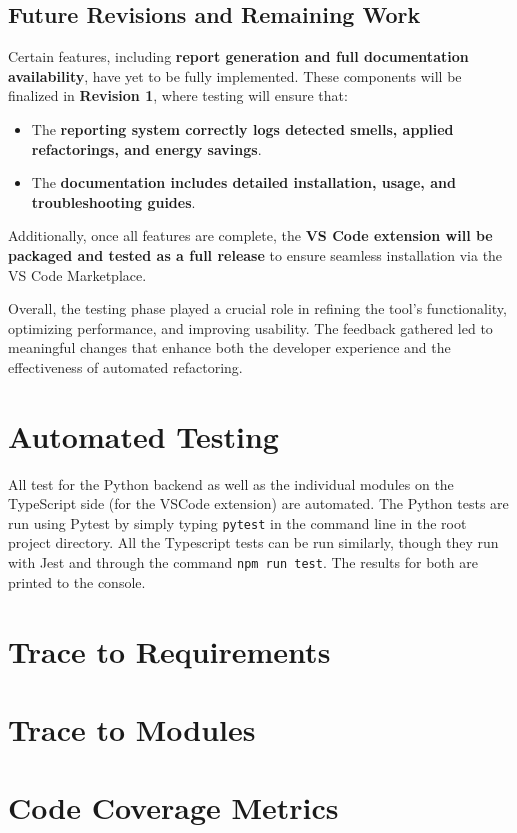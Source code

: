 \documentclass[12pt, titlepage]{article}
\begin{document}
\subsection{Future Revisions and Remaining Work}
Certain features, including \textbf{report generation and full
documentation availability}, have yet to be fully implemented. These
components will be finalized in \textbf{Revision 1}, where testing
will ensure that:
\begin{itemize}
  \item The \textbf{reporting system correctly logs detected smells,
    applied refactorings, and energy savings}.
  \item The \textbf{documentation includes detailed installation,
    usage, and troubleshooting guides}.
\end{itemize}

Additionally, once all features are complete, the \textbf{VS Code
extension will be packaged and tested as a full release} to ensure
seamless installation via the VS Code Marketplace.

\bigskip
Overall, the testing phase played a crucial role in refining the
tool’s functionality, optimizing performance, and improving
usability. The feedback gathered led to meaningful changes that
enhance both the developer experience and the effectiveness of
automated refactoring.

\section{Automated Testing}

All test for the Python backend as well as the individual modules on
the TypeScript side (for the VSCode extension) are automated. The
Python tests are run using Pytest by simply typing \texttt{pytest} in
the command line in the root project directory. All the Typescript
tests can be run similarly, though they run with Jest and through the
command \texttt{npm run test}. The results for both are printed to the console.

\section{Trace to Requirements}

\section{Trace to Modules}

\section{Code Coverage Metrics}
\end{document}
